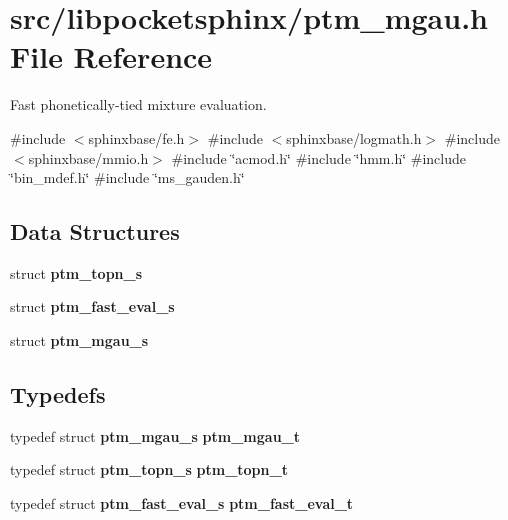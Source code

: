 \section{src/libpocketsphinx/ptm\+\_\+mgau.h File Reference}
\label{ptm__mgau_8h}


Fast phonetically-\/tied mixture evaluation.  


{\ttfamily \#include $<$sphinxbase/fe.\+h$>$}\newline
{\ttfamily \#include $<$sphinxbase/logmath.\+h$>$}\newline
{\ttfamily \#include $<$sphinxbase/mmio.\+h$>$}\newline
{\ttfamily \#include \char`\"{}acmod.\+h\char`\"{}}\newline
{\ttfamily \#include \char`\"{}hmm.\+h\char`\"{}}\newline
{\ttfamily \#include \char`\"{}bin\+\_\+mdef.\+h\char`\"{}}\newline
{\ttfamily \#include \char`\"{}ms\+\_\+gauden.\+h\char`\"{}}\newline
\subsection*{Data Structures}
\begin{DoxyCompactItemize}
\item 
struct \textbf{ ptm\+\_\+topn\+\_\+s}
\item 
struct \textbf{ ptm\+\_\+fast\+\_\+eval\+\_\+s}
\item 
struct \textbf{ ptm\+\_\+mgau\+\_\+s}
\end{DoxyCompactItemize}
\subsection*{Typedefs}
\begin{DoxyCompactItemize}
\item 
\mbox{\label{ptm__mgau_8h_ab1e3230da8b59628476ecdf70e97ec9a}} 
typedef struct \textbf{ ptm\+\_\+mgau\+\_\+s} {\bfseries ptm\+\_\+mgau\+\_\+t}
\item 
\mbox{\label{ptm__mgau_8h_a4542a2b38a0c0b8ea62432f63fa3c921}} 
typedef struct \textbf{ ptm\+\_\+topn\+\_\+s} {\bfseries ptm\+\_\+topn\+\_\+t}
\item 
\mbox{\label{ptm__mgau_8h_af870ed22578ba58631d06a1c01752ced}} 
typedef struct \textbf{ ptm\+\_\+fast\+\_\+eval\+\_\+s} {\bfseries ptm\+\_\+fast\+\_\+eval\+\_\+t}
\end{DoxyCompactItemize}
